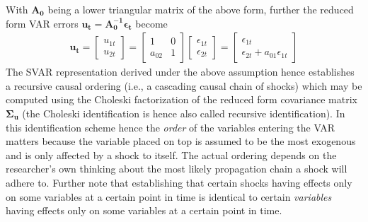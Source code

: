 \documentclass[a4paper,11pt,listof=nochaptergap,oneside,pointednumbers,bibtotoc,bigheadings,liststotoc,hidelinks]{scrbook}
\theoremstyle{mysatz}
\theoremstyle{mydefinition}
\theoremstyle{mytheorem}
\theoremstyle{mybemerkung}
\newcommand{\vect}[1]{\boldsymbol{\mathbf{#1}}}
\begin{document}
With $\vect{A_0}$ being a lower triangular matrix of the above form, further the reduced form VAR errors $\vect{u_t} = \vect{A_0^{-1}}\vect{\epsilon_t}$ become
\begin{equation} \label{eq:svar13}
\begin{split}
 		\vect{u_t} = \begin{bmatrix}
    					u_{1t} \\
					u_{2t} 
 					\end{bmatrix} = 
						\begin{bmatrix}
    						1 & 0 \\
						a_{02} & 1  
 						\end{bmatrix} 
							\begin{bmatrix}
    							\epsilon_{1t} \\
							\epsilon_{2t} 
 							\end{bmatrix} = 
								\begin{bmatrix}
    								\epsilon_{1t} \\
								\epsilon_{2t}+a_{01}\epsilon_{1t} 
 								\end{bmatrix} 			
\end{split}								
\end{equation}
The SVAR representation derived under the above assumption hence establishes a recursive causal ordering (i.e., a cascading causal chain of shocks) which may be computed using the Choleski factorization of the reduced form covariance matrix $\vect{\Sigma_u}$ (the Choleski identification is hence also called recursive identification). In this identification scheme hence the \textit{order} of the variables entering the VAR matters because the variable placed on top is assumed to be the most exogenous and is only affected by a shock to itself. The actual ordering depends on the researcher's own thinking about the most likely propagation chain a shock will adhere to. Further note that establishing that certain shocks having effects only on some variables at a certain point in time is identical to certain \textit{variables} having effects only on some variables at a certain point in time.
\end{document}

